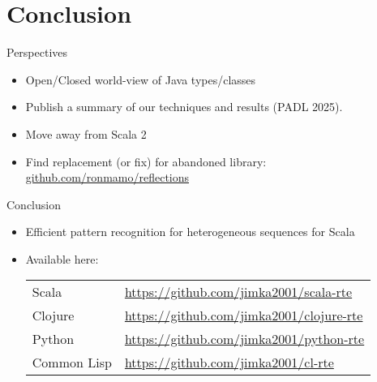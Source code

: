 \section{Conclusion}


\begin{frame}{Perspectives}
  \begin{itemize}
  \item Open/Closed world-view of Java types/classes
  \item Publish a summary of our techniques and results (PADL 2025).
  \item Move away from Scala 2
  \item Find replacement (or fix) for abandoned library:   \url{github.com/ronmamo/reflections}
  \end{itemize}
\end{frame}

\begin{frame}{Conclusion}
  \begin{itemize}
  \item Efficient pattern recognition for heterogeneous sequences for Scala
  \item Available here:

    \medskip
    
    \begin{tabular}{ll}
    Scala & \url{https://github.com/jimka2001/scala-rte}\\
    Clojure & \url{https://github.com/jimka2001/clojure-rte}\\
    Python & \url{https://github.com/jimka2001/python-rte}\\
    Common Lisp & \url{https://github.com/jimka2001/cl-rte}    
  \end{tabular}
  \end{itemize}
\end{frame}


